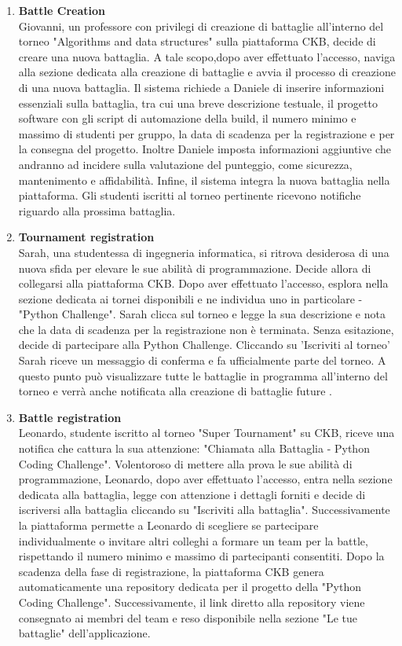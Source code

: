 \begin{enumerate}[label=\textbf{\Alph*}.]
\item \textbf{Battle Creation} \\ 
Giovanni, un professore  con privilegi di creazione di battaglie all'interno del torneo "Algorithms and data structures" sulla piattaforma CKB, decide di creare una nuova battaglia. A tale scopo,dopo aver effettuato l'accesso, naviga alla sezione dedicata alla creazione di battaglie e avvia il processo di creazione di una nuova battaglia. Il sistema richiede a Daniele di inserire informazioni essenziali sulla battaglia, tra cui una breve descrizione testuale, il progetto software con gli script di automazione della build, il numero minimo e massimo di studenti per gruppo, la data di scadenza per la registrazione e per la consegna del progetto.
Inoltre Daniele imposta informazioni aggiuntive che andranno ad incidere sulla valutazione del punteggio, come sicurezza, mantenimento e affidabilità. Infine, il sistema integra la nuova battaglia nella piattaforma. Gli studenti iscritti al torneo pertinente ricevono notifiche riguardo alla prossima battaglia.
\item \textbf{Tournament registration} \\
Sarah, una studentessa  di ingegneria informatica, si ritrova desiderosa di una nuova sfida per elevare le sue abilità di programmazione. Decide allora di collegarsi alla piattaforma CKB. Dopo aver effettuato l'accesso, esplora nella sezione dedicata ai tornei disponibili e ne individua uno in particolare - "Python  Challenge". Sarah clicca sul torneo e legge la sua descrizione e nota che la data di scadenza per la registrazione non è terminata. Senza esitazione, decide di partecipare alla Python Challenge. Cliccando su 'Iscriviti al torneo' Sarah riceve un messaggio di conferma e  fa ufficialmente parte del torneo. A questo punto può visualizzare tutte le battaglie in programma all'interno del torneo e verrà anche notificata alla creazione di battaglie future
.
\item \textbf{Battle registration} \\
Leonardo, studente iscritto al torneo "Super Tournament" su CKB, riceve una notifica che cattura la sua attenzione: "Chiamata alla Battaglia - Python Coding Challenge". Volentoroso di mettere alla prova le sue abilità di programmazione, Leonardo, dopo aver effettuato l'accesso, entra nella sezione dedicata alla battaglia, legge con attenzione i dettagli forniti e decide di iscriversi alla battaglia cliccando su "Iscriviti alla battaglia". Successivamente la piattaforma permette a Leonardo di scegliere se partecipare individualmente o invitare altri colleghi a formare un team per la battle, rispettando il numero minimo e massimo di partecipanti consentiti. Dopo la scadenza della fase di registrazione, la piattaforma CKB genera automaticamente una repository dedicata per il progetto della "Python Coding Challenge". Successivamente, il link diretto alla repository viene consegnato ai membri del team e reso disponibile nella sezione "Le tue battaglie" dell'applicazione.

\end{enumerate}
